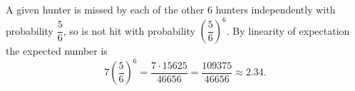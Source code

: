 A given hunter is missed by each of the other $6$ hunters independently with probability $\dfrac56$, so is not hit with probability $\left(\dfrac56\right)^6$. By linearity of expectation the expected number is
\[7\left(\dfrac56\right)^6=\dfrac{7\cdot15625}{46656}=\boxed{\dfrac{109375}{46656}}\approx2.34.\]
